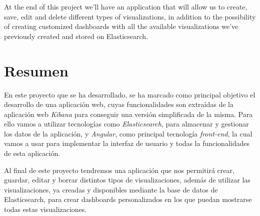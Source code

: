\documentclass[a4paper, 12pt, english]{book}
\begin{document}
At the end of this project we'll have an application that will allow us to create, save, edit and delete different types of visualizations, in addition to the possibility of creating customized dashboards with all the available visualizations we've previously created and stored on Elasticsearch.





\chapter*{Resumen}
En este proyecto que se ha desarrollado, se ha marcado como principal objetivo el desarrollo de una aplicación web, cuyas funcionalidades son extraídas de la aplicación web \textit{Kibana} para conseguir una versión simplificada de la misma. Para ello vamos a utilizar tecnologías como \textit{Elasticsearch}, para almacenar y gestionar los datos de la aplicación, y \textit{Angular}, como principal tecnología \textit{front-end}, la cual vamos a usar para implementar la interfaz de usuario y todas la funcionalidades de esta aplicación.

Al final de este proyecto tendremos una aplicación que nos permitirá crear, guardar, editar y borrar distintos tipos de  visualizaciones, además de utilizar las visualizaciones, ya creadas y disponibles mediante la base de datos de Elasticsearch, para crear dashboards personalizados en los que puedan mostrarse todas estas visualizaciones.

\end{document}
